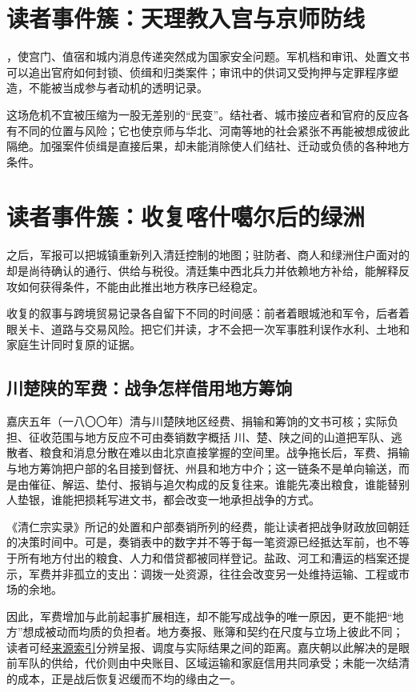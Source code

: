 \section{读者事件簇：天理教入宫与京师防线}

，使宫门、值宿和城内消息传递突然成为国家安全问题。军机档和审讯、处置文书可以追出官府如何封锁、侦缉和归类案件；审讯中的供词又受拘押与定罪程序塑造，不能被当成参与者动机的透明记录。

这场危机不宜被压缩为一股无差别的“民变”。结社者、城市接应者和官府的反应各有不同的位置与风险；它也使京师与华北、河南等地的社会紧张不再能被想成彼此隔绝。加强案件侦缉是直接后果，却未能消除使人们结社、迁动或负债的各种地方条件。

\section{读者事件簇：收复喀什噶尔后的绿洲}

之后，军报可以把城镇重新列入清廷控制的地图；驻防者、商人和绿洲住户面对的却是尚待确认的通行、供给与税役。清廷集中西北兵力并依赖地方补给，能解释反攻如何获得条件，不能由此推出地方秩序已经稳定。

收复的叙事与跨境贸易记录各自留下不同的时间感：前者着眼城池和军令，后者着眼关卡、道路与交易风险。把它们并读，才不会把一次军事胜利误作水利、土地和家庭生计同时复原的证据。

\subsection{川楚陕的军费：战争怎样借用地方筹饷}
\begin{event}{}{嘉庆五年（一八〇〇年）}{清与川楚陕地区}{经费、捐输和筹饷的文书可核；实际负担、征收范围与地方反应不可由奏销数字概括}
川、楚、陕之间的山道把军队、逃散者、粮食和消息分散在难以由北京直接掌握的空间里。战争拖长后，军费、捐输与地方筹饷把户部的名目接到督抚、州县和地方中介；这一链条不是单向输送，而是由催征、解运、垫付、报销与追欠构成的反复往来。谁能先凑出粮食，谁能替别人垫银，谁能把损耗写进文书，都会改变一地承担战争的方式。

《清仁宗实录》所记的处置和户部奏销所列的经费，能让读者把战争财政放回朝廷的决策时间中。可是，奏销表中的数字并不等于每一笔资源已经抵达军前，也不等于所有地方付出的粮食、人力和借贷都被同样登记。盐政、河工和漕运的档案还提示，军费并非孤立的支出：调拨一处资源，往往会改变另一处维持运输、工程或市场的余地。

因此，军费增加与此前起事扩展相连，却不能写成战争的唯一原因，更不能把“地方”想成被动而均质的负担者。地方奏报、账簿和契约在尺度与立场上彼此不同；读者可经\hyperref[app:sources]{来源索引}分辨呈报、调度与实际结果之间的距离。嘉庆朝以此解决的是眼前军队的供给，代价则由中央账目、区域运输和家庭信用共同承受；未能一次结清的成本，正是战后恢复迟缓而不均的缘由之一。
\end{event}
